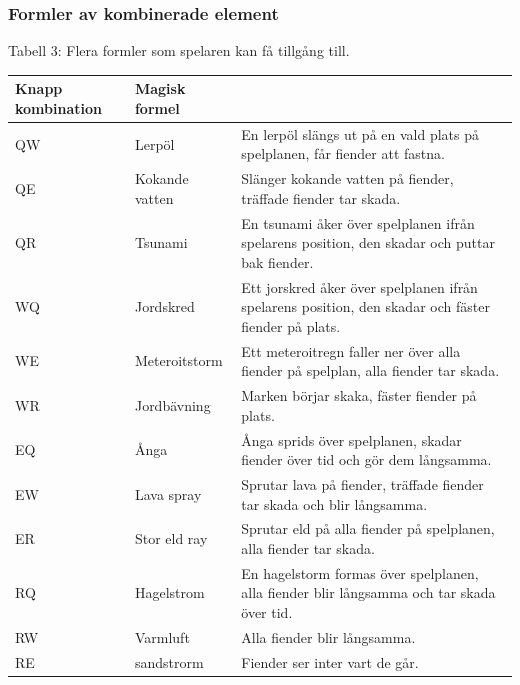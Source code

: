 \documentclass[12pt]{TDP005mall}
\begin{document}
\clearpage

\subsubsection{Formler av kombinerade element}
Tabell 3: Flera formler som spelaren kan få tillgång till.
\begin{table}[H]
\begin{tabularx}{\linewidth}{|l|l|X|}
\hline
\textbf{Knapp kombination} & \textbf{Magisk formel} \\ \hline
QW             & Lerpöl         & En lerpöl slängs ut på en vald plats på spelplanen, får fiender att fastna.        \\ \hline
QE             & Kokande vatten & Slänger kokande vatten på fiender, träffade fiender tar skada.        \\ \hline
QR             & Tsunami        & En tsunami åker över spelplanen ifrån spelarens position, den skadar och puttar bak fiender.       \\ \hline
WQ             & Jordskred      & Ett jorskred åker över spelplanen ifrån spelarens position, den skadar och fäster fiender på plats.        \\ \hline
WE             & Meteroitstorm  & Ett meteroitregn faller ner över alla fiender på spelplan, alla fiender tar skada.        \\ \hline
WR             & Jordbävning    & Marken börjar skaka, fäster fiender på plats.        \\ \hline
EQ             & Ånga           & Ånga sprids över spelplanen, skadar fiender över tid och gör dem långsamma.        \\ \hline
EW             & Lava spray     & Sprutar lava på fiender, träffade fiender tar skada och blir långsamma.        \\ \hline
ER             & Stor eld ray   & Sprutar eld på alla fiender på spelplanen, alla fiender tar skada.        \\ \hline
RQ             & Hagelstrom     & En hagelstorm formas över spelplanen, alla fiender blir långsamma och tar skada över tid.        \\ \hline
RW             & Varmluft       & Alla fiender blir långsamma.        \\ \hline
RE             & sandstrorm     & Fiender ser inter vart de går.        \\ \hline
\end{tabularx}\\

\end{table}
\end{document}
